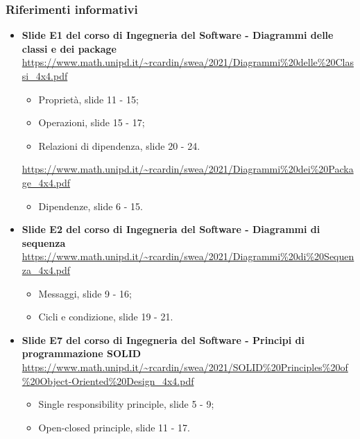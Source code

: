 \subsubsection{Riferimenti informativi} \label{riferimenti}
\begin{itemize}
	\item \textbf{Slide E1 del corso di Ingegneria del Software - Diagrammi delle classi e dei package}\\
	\textcolor{blue}{\url{https://www.math.unipd.it/~rcardin/swea/2021/Diagrammi\%20delle\%20Classi_4x4.pdf}}
	
	\begin{itemize}
		\item Proprietà, slide 11 - 15;
		\item Operazioni, slide 15 - 17;
		\item Relazioni di dipendenza, slide 20 - 24.
	\end{itemize}
	
	\textcolor{blue}{\url{https://www.math.unipd.it/~rcardin/swea/2021/Diagrammi\%20dei\%20Package_4x4.pdf}}
	
	\begin{itemize}
		\item Dipendenze, slide 6 - 15.
	\end{itemize}
	
	\newpage
	
	\item \textbf{Slide E2 del corso di Ingegneria del Software - Diagrammi di sequenza}\\
	\textcolor{blue}{\url{https://www.math.unipd.it/~rcardin/swea/2021/Diagrammi\%20di\%20Sequenza_4x4.pdf}}
	
	\begin{itemize}
		\item Messaggi, slide 9 - 16;
		\item Cicli e condizione, slide 19 - 21.
	\end{itemize}
	
	\item \textbf{Slide E7 del corso di Ingegneria del Software - Principi di programmazione SOLID}\\
\textcolor{blue}{\url{https://www.math.unipd.it/~rcardin/swea/2021/SOLID\%20Principles\%20of\%20Object-Oriented\%20Design_4x4.pdf}}

	\begin{itemize}
		\item Single responsibility principle, slide 5 - 9;
		\item Open-closed principle, slide 11 - 17.
	\end{itemize}
	

\end{itemize}
